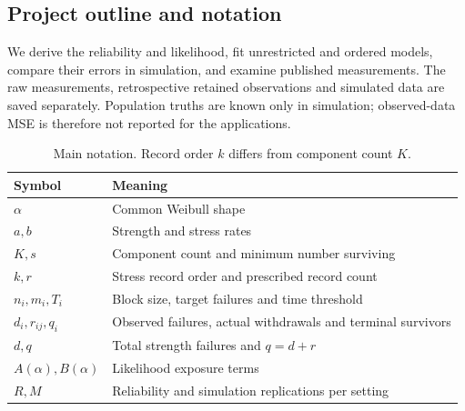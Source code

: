 \subsection{Project outline and notation}
We derive the reliability and likelihood, fit unrestricted and ordered models, compare their errors in simulation, and examine published measurements. The raw measurements, retrospective retained observations and simulated data are saved separately. Population truths are known only in simulation; observed-data MSE is therefore not reported for the applications.

\begin{table}[htbp]
\centering
\caption{Main notation. Record order $k$ differs from component count $K$.}\label{tab:notation}
\small
\begin{tabular}{lp{.72\linewidth}}
\toprule
Symbol & Meaning \\
\midrule
$\alpha$ & Common Weibull shape \\
$a,b$ & Strength and stress rates \\
$K,s$ & Component count and minimum number surviving \\
$k,r$ & Stress record order and prescribed record count \\
$n_i,m_i,T_i$ & Block size, target failures and time threshold \\
$d_i,r_{ij},q_i$ & Observed failures, actual withdrawals and terminal survivors \\
$d,q$ & Total strength failures and $q=d+r$ \\
$A(\alpha),B(\alpha)$ & Likelihood exposure terms \\
$R,M$ & Reliability and simulation replications per setting \\
\bottomrule
\end{tabular}
\end{table}
